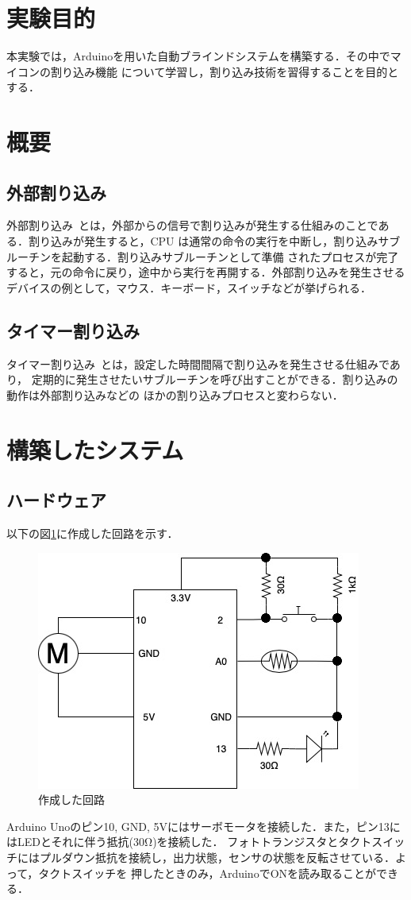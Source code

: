\documentclass[a4paper,11pt]{jsarticle}
\begin{document}
\section{実験目的}
本実験では，Arduinoを用いた自動ブラインドシステムを構築する．その中でマイコンの割り込み機能
について学習し，割り込み技術を習得することを目的とする．
\section{概要}
\subsection{外部割り込み}
外部割り込み~\cite{interrupt1}とは，外部からの信号で割り込みが発生する仕組みのことである．割り込みが発生すると，CPU
は通常の命令の実行を中断し，割り込みサブルーチンを起動する．割り込みサブルーチンとして準備
されたプロセスが完了すると，元の命令に戻り，途中から実行を再開する．外部割り込みを発生させる
デバイスの例として，マウス．キーボード，スイッチなどが挙げられる．
\subsection{タイマー割り込み}
タイマー割り込み~\cite{interrupt2}とは，設定した時間間隔で割り込みを発生させる仕組みであり，
定期的に発生させたいサブルーチンを呼び出すことができる．割り込みの動作は外部割り込みなどの
ほかの割り込みプロセスと変わらない．

\section{構築したシステム}

\subsection{ハードウェア}
以下の図\ref{P:circuit}に作成した回路を示す．
\begin{figure}[H]
  \centering
  \includegraphics[width=0.7\linewidth]{Circuit.jpg}
  \caption{作成した回路}
  \label{P:circuit}
\end{figure}
Arduino Unoのピン10, GND, 5Vにはサーボモータを接続した．また，ピン13にはLEDとそれに伴う抵抗($30\si{\ohm}$)を接続した．
フォトトランジスタとタクトスイッチにはプルダウン抵抗を接続し，出力状態，センサの状態を反転させている．よって，タクトスイッチを
押したときのみ，ArduinoでONを読み取ることができる．
\end{document}
